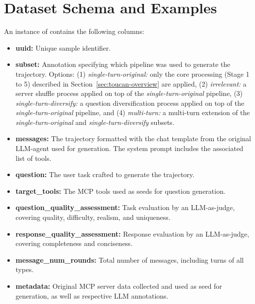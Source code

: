 \clearpage
\section{Dataset Schema and Examples}
\label{app:dataset-schema}

An instance of \dataname contains the following columns:
\begin{itemize}
    \item \textbf{uuid:} Unique sample identifier.
    \item \textbf{subset:} Annotation specifying which pipeline was used to generate the trajectory. Options:
    (1) \textit{single-turn-original:} only the core processing (Stage 1 to 5) described in Section~\ref{sec:toucan-overview} are applied, (2) \textit{irrelevant:} a server shuffle process applied on top of the \textit{single-turn-original} pipeline, (3) \textit{single-turn-diversify:} a question diversification process applied on top of the \textit{single-turn-original} pipeline, and (4) \textit{multi-turn:} a multi-turn extension of the \textit{single-turn-original} and \textit{single-turn-diversify} subsets.
    \item \textbf{messages:} The trajectory formatted with the chat template from the original LLM-agent used for generation. The system prompt includes the associated list of tools.
    \item \textbf{question:} The user task crafted to generate the trajectory.
    \item \textbf{target\_tools:} The MCP tools used as seeds for question generation.
    \item \textbf{question\_quality\_assessment:} Task evaluation by an LLM-as-judge, covering quality, difficulty, realism, and uniqueness.
    \item \textbf{response\_quality\_assessment:} Response evaluation by an LLM-as-judge, covering completeness and conciseness.
    \item \textbf{message\_num\_rounds:} Total number of messages, including turns of all types.
    \item \textbf{metadata:} Original MCP server data collected and used as seed for generation, as well as respective LLM annotations.
\end{itemize}

